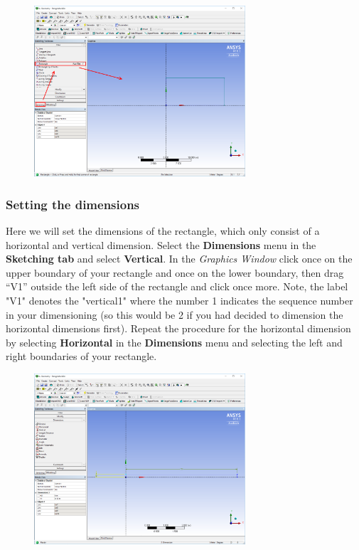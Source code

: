\documentclass[11pt,a4paper,oneside,hidelinks]{scrartcl}
\newcommand\bfr[1]{\textcolor[rgb]{1,0.00,0.00}{\textbf{\textsf{#1}}}}
\begin{document}
\begin{figure}[H]
\begin{center}
\includegraphics[width=0.7\textwidth,clip]{draw_rectangle.png}
\end{center}
\end{figure}

\subsubsection{Setting the dimensions}
Here we will set the dimensions of the rectangle, which only consist of a horizontal and vertical dimension. Select the \bfr{Dimensions} menu in the \bfr{Sketching tab} and select \bfr{Vertical}. In the \emph{Graphics Window} click once on the upper boundary of your rectangle and once on the lower boundary, then drag  ``V1'' outside the left side of the rectangle and click once more. Note, the label "V1"  denotes the "vertical1" where the number 1 indicates the sequence number in your dimensioning (so this would be 2 if you had decided to dimension the horizontal dimensions first). Repeat the procedure for the horizontal dimension by selecting \bfr{Horizontal} in the \bfr{Dimensions} menu and selecting the left and right boundaries of your rectangle.

\begin{figure}[H]
\begin{center}
\includegraphics[width=0.7\textwidth,clip]{rectangle_dimensions.png}
\end{center}
\end{figure}
\end{document}
